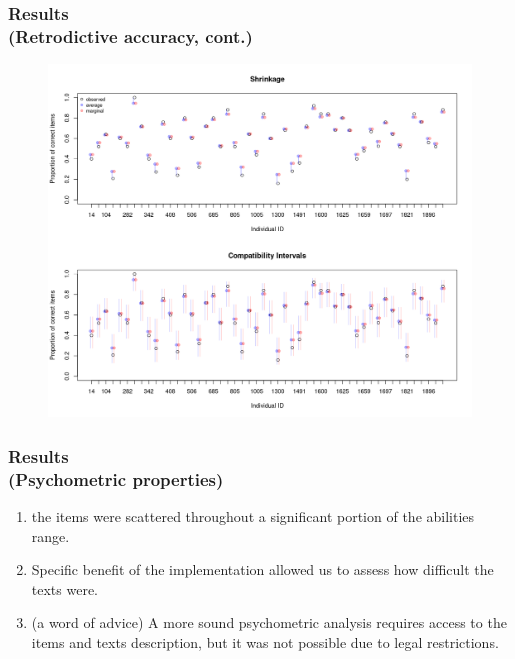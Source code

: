 \documentclass[arial,12pt,xcolor=dvipsnames]{beamer}
\begin{document}
%
\begin{frame}
	\frametitle{Results \\
		(Retrodictive accuracy, cont.)}
	\begin{figure}[H]
		\centering
		\includegraphics[width=0.85\linewidth]{FOLV_NC_HitRate_ind}
		\label{fig:FOLV_pred_app}
	\end{figure} 
\end{frame}
%
\begin{frame}
	\frametitle{Results \\
		(Psychometric properties)}
	\begin{enumerate}
		\item the items were scattered throughout a significant portion of the abilities range. 
		\item Specific benefit of the implementation allowed us to assess
		how difficult the texts were.
		\item (a word of advice) A more sound psychometric analysis requires access to the items and texts description, but it was not possible due to legal restrictions.
	\end{enumerate} 
\end{frame}
%
\end{document}
